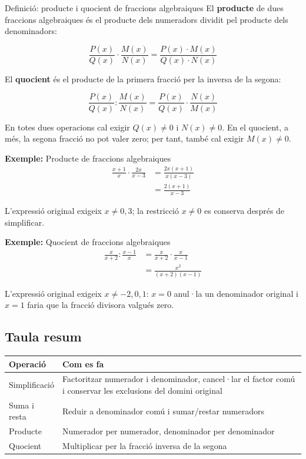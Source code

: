 \begin{definicio}{Definició: producte i quocient de fraccions algebraiques}
El \textbf{producte} de dues fraccions algebraiques és el producte dels numeradors dividit pel producte dels denominadors:

\[
\frac{P(x)}{Q(x)} \cdot \frac{M(x)}{N(x)} = \frac{P(x)\cdot M(x)}{Q(x)\cdot N(x)}
\]

El \textbf{quocient} és el producte de la primera fracció per la inversa de la segona:

\[
\frac{P(x)}{Q(x)} : \frac{M(x)}{N(x)} = \frac{P(x)}{Q(x)} \cdot \frac{N(x)}{M(x)}
\]

En totes dues operacions cal exigir $Q(x)\neq0$ i $N(x)\neq0$. En el quocient, a més, la segona fracció no pot valer zero; per tant, també cal exigir $M(x)\neq0$.
\end{definicio}

\begin{exemple}{\textbf{Exemple:} Producte de fraccions algebraiques}
\[
\begin{aligned}
\frac{x+1}{x} \cdot \frac{2x}{x-3} &= \frac{2x(x+1)}{x(x-3)} \\
&= \frac{2(x+1)}{x-3}
\end{aligned}
\]

L'expressió original exigeix $x\neq0,3$; la restricció $x\neq0$ es conserva després de simplificar.
\end{exemple}

\begin{exemple}{\textbf{Exemple:} Quocient de fraccions algebraiques}
\[
\begin{aligned}
\frac{x}{x+2} : \frac{x-1}{x} &= \frac{x}{x+2} \cdot \frac{x}{x-1} \\
&= \frac{x^2}{(x+2)(x-1)}
\end{aligned}
\]

L'expressió original exigeix $x\neq-2,0,1$: $x=0$ anul·la un denominador original i $x=1$ faria que la fracció divisora valgués zero.
\end{exemple}

\subsection{Taula resum}

\begin{center}
\begin{tabularx}{\linewidth}{lY}
\toprule
\textbf{Operació} & \textbf{Com es fa} \\
\midrule
Simplificació & Factoritzar numerador i denominador, cancel·lar el factor comú i conservar les exclusions del domini original \\
Suma i resta & Reduir a denominador comú i sumar/restar numeradors \\
Producte & Numerador per numerador, denominador per denominador \\
Quocient & Multiplicar per la fracció inversa de la segona \\
\bottomrule
\end{tabularx}
\end{center}
